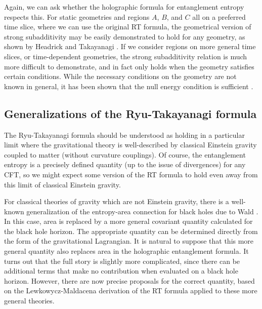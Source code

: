 \documentclass[12pt,epsf]{article}
\begin{document}
Again, we can ask whether the holographic formula for entanglement entropy respects this. For static geometries and regions $A$, $B$, and $C$ all on a preferred time slice, where we can use the original RT formula, the geometrical version of strong subadditivity may be easily demonstrated to hold for any geometry, as shown by Headrick and Takayanagi \cite{headrick2007holographic}. If we consider regions on more general time slices, or time-dependent geometries, the strong subadditivity relation is much more difficult to demonstrate, and in fact only holds when the geometry satisfies certain conditions. While the necessary conditions on the geometry are not known in general, it has been shown that the null energy condition is sufficient \cite{Wall:2012uf}.

\subsection{Generalizations of the Ryu-Takayanagi formula}

The Ryu-Takayanagi formula should be understood as holding in a particular limit where the gravitational theory is well-described by classical Einstein gravity coupled to matter (without curvature couplings). Of course, the entanglement entropy is a precisely defined quantity (up to the issue of divergences) for any CFT, so we might expect some version of the RT formula to hold even away from this limit of classical Einstein gravity.

For classical theories of gravity which are not Einstein gravity, there is a well-known generalization of the entropy-area connection for black holes due to Wald \cite{Wald:1993nt}. In this case, area is replaced by a more general covariant quantity calculated for the black hole horizon. The appropriate quantity can be determined directly from the form of the gravitational Lagrangian. It is natural to suppose that this more general quantity also replaces area in the holographic entanglement formula. It turns out that the full story is slightly more complicated, since there can be additional terms that make no contribution when evaluated on a black hole horizon. However, there are now precise proposals \cite{Camps:2013zua,Dong:2013qoa} for the correct quantity, based on the Lewkowycz-Maldacena derivation of the RT formula applied to these more general theories.
\end{document}
